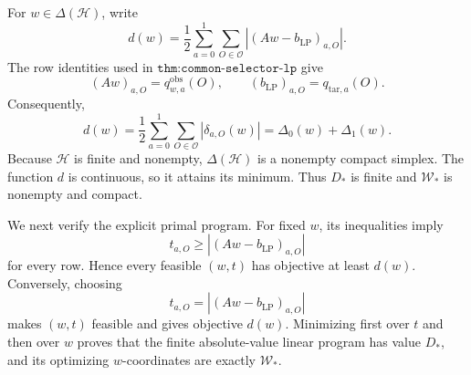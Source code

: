 For \(w\in\Delta(\mathcal H)\), write
\[
d(w)=\frac12\sum_{a=0}^1\sum_{O\in\mathcal O}|(Aw-b_{\mathrm{LP}})_{a,O}|.
\tag{1}
\]
The row identities used in \(\texttt{thm:common-selector-lp}\) give
\[
(Aw)_{a,O}=q^{\mathrm{obs}}_{w,a}(O),\qquad (b_{\mathrm{LP}})_{a,O}=q_{\mathrm{tar},a}(O).
\tag{2}
\]
Consequently,
\[
d(w)=\frac12\sum_{a=0}^1\sum_{O\in\mathcal O}|\delta_{a,O}(w)|=\Delta_0(w)+\Delta_1(w).
\tag{3}
\]
Because \(\mathcal H\) is finite and nonempty, \(\Delta(\mathcal H)\) is a nonempty compact simplex. The function \(d\) is continuous, so it attains its minimum. Thus \(D_*\) is finite and \(\mathcal W_*\) is nonempty and compact.

We next verify the explicit primal program. For fixed \(w\), its inequalities imply
\[
t_{a,O}\ge |(Aw-b_{\mathrm{LP}})_{a,O}|
\tag{4}
\]
for every row. Hence every feasible \((w,t)\) has objective at least \(d(w)\). Conversely, choosing
\[
t_{a,O}=|(Aw-b_{\mathrm{LP}})_{a,O}|
\tag{5}
\]
makes \((w,t)\) feasible and gives objective \(d(w)\). Minimizing first over \(t\) and then over \(w\) proves that the finite absolute-value linear program has value \(D_*\), and its optimizing \(w\)-coordinates are exactly \(\mathcal W_*\).


